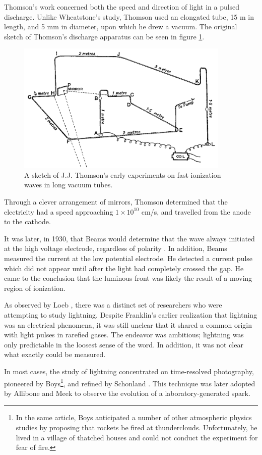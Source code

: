 Thomson's work concerned both the speed and direction of light in a pulsed
discharge. Unlike Wheatstone's study, Thomson used an elongated tube, 15 m in
length, and 5 mm in diameter, upon which he drew a vacuum. The original sketch
of Thomson's discharge apparatus can be seen in figure \ref{fig:thomson}.
\begin{figure}
  \centering
  \includegraphics[width=4in]{chapters/introduction/figures/thomson.png}
  \caption{A sketch of J.J. Thomson's early experiments on fast ionization
  waves in long vacuum tubes.}\label{fig:thomson}
\end{figure}
Through a clever arrangement of mirrors, Thomson determined that the electricity
had a speed approaching $1\times10^{10}$ cm/s, and travelled from the anode to
the cathode.

It was later, in 1930, that Beams would determine that the wave always initiated
at the high voltage electrode, regardless of polarity \cite{Beams1930}. In
addition, Beams measured the current at the low potential electrode. He detected
a current pulse which did not appear until after the light had completely
crossed the gap. He came to the conclusion that the luminous front was likely
the result of a moving region of ionization.

As observed by Loeb \cite{Loeb1965}, there was a distinct set of researchers who
were attempting to study lightning. Despite Franklin's earlier realization that
lightning was an electrical phenomena, it was still unclear that it shared a
common origin with light pulses in rarefied gases. The endeavor was ambitious;
lightning was only predictable in the loosest sense of the word. In addition, it
was not clear what exactly could be measured.

In most cases, the study of lightning concentrated on time-resolved photography,
pioneered by Boys\footnote{In the same article, Boys anticipated a number of
other atmospheric physics studies by proposing that rockets be fired at 
thunderclouds. Unfortunately, he lived in a village of thatched houses and
could not conduct the experiment for fear of fire.}\cite{Boys1926}, and refined
by Schonland \cite{Schonland1935}. This technique was later adopted by Allibone
and Meek \cite{Allibone1938} to observe the evolution of a laboratory-generated
spark.

